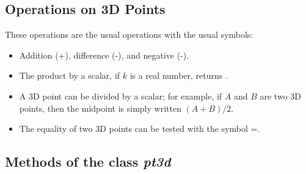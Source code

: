 \subsection{Operations on 3D Points}

These operations are the usual operations with the usual symbols:
\begin{itemize}
    \item Addition (+), difference (-), and negative (-).
    \item The product by a scalar, if $k$ is a real number,  returns .
    \item A 3D point can be divided by a scalar; for example, if $A$ and $B$ are two 3D points, then the midpoint is simply written $(A+B)/2$.
    \item The equality of two 3D points can be tested with the symbol =.
\end{itemize}

\subsection{Methods of the class \emph{pt3d}}

